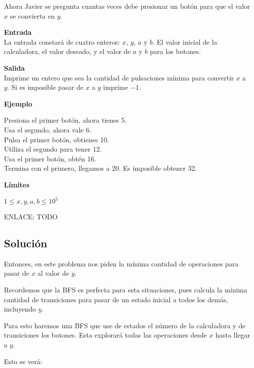 Ahora Javier se pregunta cuantas veces debe presionar un botón para que el valor \(x\) se convierta en \(y\).

\textbf{Entrada}\\
La entrada constará de cuatro enteros: \(x\), \(y\), \(a\) y \(b\). El valor inicial de la calculadora, el valor deseado, y el valor de \(a\) y \(b\) para los botones.

\textbf{Salida}\\
Imprime un entero que sea la cantidad de pulsaciones mínima para convertir \(x\) a \(y\). Si es imposible pasar de \(x\) a \(y\) imprime \(-1\).

\textbf{Ejemplo}\\
\begin{casebox3}
	{	Presiona el primer botón, ahora tienes 5.\\		
		Usa el segundo, ahora vale 6.\\
		Pulsa el primer botón, obtienes 10.\\
		Utiliza el segundo para tener 12.\\
		Usa el primer botón, obtén 16.\\
		Termina con el primero, llegamos a 20.
	}
	{	Es imposible obtener 32.
	}
\end{casebox3}

\textbf{Límites}
\begin{plimits}
	\item \(1\leq x,y,a,b \leq 10^5\)
\end{plimits}

ENLACE: TODO

\subsection*{Solución}
Entonces, en este problema nos piden la mínima cantidad de operaciones para pasar de \(x\) al valor de \(y\).

Recordemos que la BFS es perfecta para esta situaciones, pues calcula la mínima cantidad de transiciones para pasar de un estado inicial a todos los demás, incluyendo \(y\).

Para esto haremos una BFS que use de estados el número de la calculadora y de transiciones los botones. Esta explorará todas las operaciones desde \(x\) hasta llegar a \(y\).

Esto se verá:

